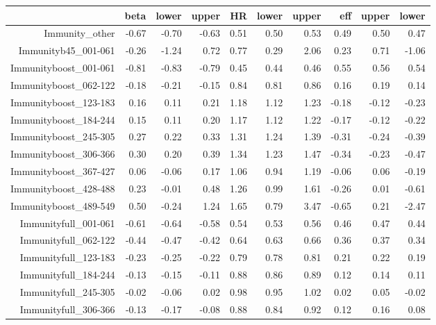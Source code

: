 \begin{table}[ht]
\centering
\begin{tabular}{rrrrrrrrrr}
  \hline
 & beta & lower & upper & HR & lower & upper & eff & upper & lower \\ 
  \hline
Immunity\_other & -0.67 & -0.70 & -0.63 & 0.51 & 0.50 & 0.53 & 0.49 & 0.50 & 0.47 \\ 
  Immunityb45\_001-061 & -0.26 & -1.24 & 0.72 & 0.77 & 0.29 & 2.06 & 0.23 & 0.71 & -1.06 \\ 
  Immunityboost\_001-061 & -0.81 & -0.83 & -0.79 & 0.45 & 0.44 & 0.46 & 0.55 & 0.56 & 0.54 \\ 
  Immunityboost\_062-122 & -0.18 & -0.21 & -0.15 & 0.84 & 0.81 & 0.86 & 0.16 & 0.19 & 0.14 \\ 
  Immunityboost\_123-183 & 0.16 & 0.11 & 0.21 & 1.18 & 1.12 & 1.23 & -0.18 & -0.12 & -0.23 \\ 
  Immunityboost\_184-244 & 0.15 & 0.11 & 0.20 & 1.17 & 1.12 & 1.22 & -0.17 & -0.12 & -0.22 \\ 
  Immunityboost\_245-305 & 0.27 & 0.22 & 0.33 & 1.31 & 1.24 & 1.39 & -0.31 & -0.24 & -0.39 \\ 
  Immunityboost\_306-366 & 0.30 & 0.20 & 0.39 & 1.34 & 1.23 & 1.47 & -0.34 & -0.23 & -0.47 \\ 
  Immunityboost\_367-427 & 0.06 & -0.06 & 0.17 & 1.06 & 0.94 & 1.19 & -0.06 & 0.06 & -0.19 \\ 
  Immunityboost\_428-488 & 0.23 & -0.01 & 0.48 & 1.26 & 0.99 & 1.61 & -0.26 & 0.01 & -0.61 \\ 
  Immunityboost\_489-549 & 0.50 & -0.24 & 1.24 & 1.65 & 0.79 & 3.47 & -0.65 & 0.21 & -2.47 \\ 
  Immunityfull\_001-061 & -0.61 & -0.64 & -0.58 & 0.54 & 0.53 & 0.56 & 0.46 & 0.47 & 0.44 \\ 
  Immunityfull\_062-122 & -0.44 & -0.47 & -0.42 & 0.64 & 0.63 & 0.66 & 0.36 & 0.37 & 0.34 \\ 
  Immunityfull\_123-183 & -0.23 & -0.25 & -0.22 & 0.79 & 0.78 & 0.81 & 0.21 & 0.22 & 0.19 \\ 
  Immunityfull\_184-244 & -0.13 & -0.15 & -0.11 & 0.88 & 0.86 & 0.89 & 0.12 & 0.14 & 0.11 \\ 
  Immunityfull\_245-305 & -0.02 & -0.06 & 0.02 & 0.98 & 0.95 & 1.02 & 0.02 & 0.05 & -0.02 \\ 
  Immunityfull\_306-366 & -0.13 & -0.17 & -0.08 & 0.88 & 0.84 & 0.92 & 0.12 & 0.16 & 0.08 \\ 

\end{tabular}
\end{table}
